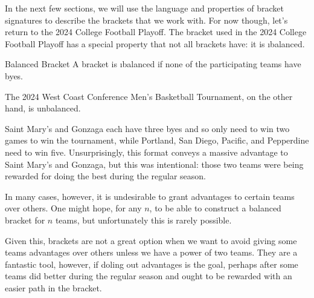 {In the next few sections, we will use the language and properties of bracket signatures to describe the brackets that we work with. For now though, let's return to the 2024 College Football Playoff. The bracket used in the 2024 College Football Playoff has a special property that not all brackets have: it is \i{balanced}.

\begin{definition}{Balanced Bracket}{}
    A bracket is \i{balanced} if none of the participating teams have byes.
\end{definition} 

The 2024 West Coast Conference Men's Basketball Tournament, on the other hand, is unbalanced.

Saint Mary's and Gonzaga each have three byes and so only need to win two games to win the tournament, while Portland, San Diego, Pacific, and Pepperdine need to win five. Unsurprisingly, this format conveys a massive advantage to Saint Mary's and Gonzaga, but this was intentional: those two teams were being rewarded for doing the best during the regular season.

In many cases, however, it is undesirable to grant advantages to certain teams over others. One might hope, for any $n$, to be able to construct a balanced bracket for $n$ teams, but unfortunately this is rarely possible.


Given this, brackets are not a great option when we want to avoid giving some teams advantages over others unless we have a power of two teams. They are a fantastic tool, however, if doling out advantages is the goal, perhaps after some teams did better during the regular season and ought to be rewarded with an easier path in the bracket.
}